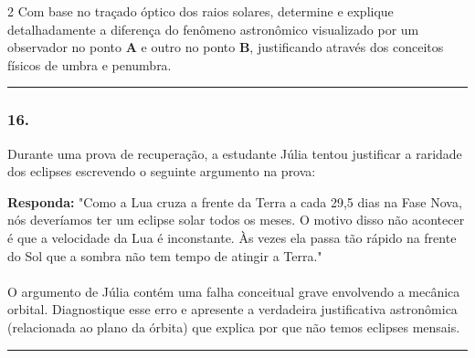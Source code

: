 \documentclass[twoside, 10pt, a4paper]{article}
\newlength{\espacoPreQuestao}
\newlength{\espacoQuestao}
\begin{document}
\begin{multicols*}{2}
Com base no traçado óptico dos raios solares, determine e explique detalhadamente a diferença do fenômeno astronômico visualizado por um observador no ponto \textbf{A} e outro no ponto \textbf{B}, justificando através dos conceitos físicos de umbra e penumbra.
\par\vspace{\espacoQuestao}

\noindent\textcolor{CorLinha}{\rule{\linewidth}{0.5pt}} 
\par\vspace{\espacoPreQuestao}
\subsubsection*{16.} Durante uma prova de recuperação, a estudante Júlia tentou justificar a raridade dos eclipses escrevendo o seguinte argumento na prova:

\begin{boxresponda}
\textbf{Responda:} "Como a Lua cruza a frente da Terra a cada 29,5 dias na Fase Nova, nós deveríamos ter um eclipse solar todos os meses. O motivo disso não acontecer é que a velocidade da Lua é inconstante. Às vezes ela passa tão rápido na frente do Sol que a sombra não tem tempo de atingir a Terra."\\
\\
O argumento de Júlia contém uma falha conceitual grave envolvendo a mecânica orbital. Diagnostique esse erro e apresente a verdadeira justificativa astronômica (relacionada ao plano da órbita) que explica por que não temos eclipses mensais.
\end{boxresponda}
\par\vspace{\espacoQuestao}

\noindent\textcolor{CorLinha}{\rule{\linewidth}{0.5pt}} 
\par\vspace{\espacoPreQuestao}

\end{multicols*}
\end{document}
